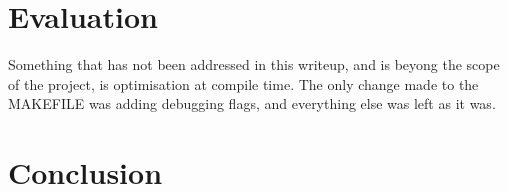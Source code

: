 \documentclass[11pt,journal]{IEEEtran}
\begin{document}
	\section{Evaluation}
	Something that has not been addressed in this writeup, and is beyong the scope of the project, is optimisation at compile time. The only change made to the MAKEFILE was adding debugging flags, and everything else was left as it was.
	
	\section{Conclusion}
	
	
	
		
		
	
\end{document}
